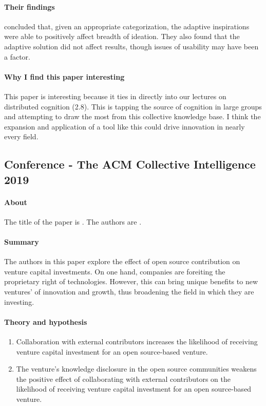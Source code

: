 \paragraph{Their findings} concluded that, given an appropriate categorization, the adaptive inspirations were able to positively affect breadth of ideation. They also found that the adaptive solution did not affect results, though issues of usability may have been a factor.

\paragraph{Why I find this paper interesting}
This paper is interesting because it ties in directly into our lectures on distributed cognition (2.8). This is tapping the source of cognition in large groups and attempting to draw the most from this collective knowledge base. I think the expansion and application of a tool like this could drive innovation in nearly every field.

\subsection{Conference - The ACM Collective Intelligence 2019}

\paragraph{About}
The title of the paper is . The authors are .

\paragraph{Summary}
The authors in this paper explore the effect of open source contribution on venture capital investments. On one hand, companies are foreiting the proprietary right of technologies. However, this can bring unique benefits to new ventures' of innovation and growth, thus broadening the field in which they are investing.

\paragraph{Theory and hypothesis}

\begin{enumerate}
\item
  Collaboration with external contributors increases the likelihood of receiving venture capital investment for an open source-based venture.
\item
   The venture’s knowledge disclosure in the open source communities weakens the positive effect of collaborating with external contributors on the likelihood of receiving venture capital investment for an open source-based venture.
\end{enumerate}

